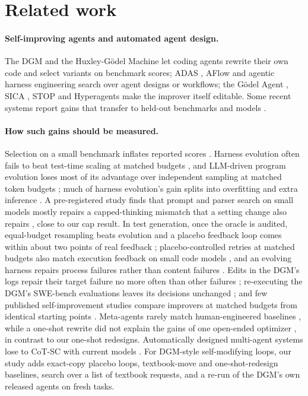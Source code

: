 \section{Related work}\label{sec:related}
\paragraph{Self-improving agents and automated agent design.} The DGM \citep{zhang2026dgm} and the Huxley-G\"odel
Machine \citep{wang2026hgm} let coding agents rewrite their own code and select variants on benchmark scores; ADAS
\citep{hu2025adas}, AFlow \citep{zhang2025aflow} and agentic harness engineering \citep{lin2026ahe} search over agent
designs or workflows; the G\"odel Agent \citep{yin2025godel}, SICA \citep{robeyns2025sica}, STOP \citep{zelikman2023stop}
and Hyperagents \citep{zhang2026hyperagents} make the improver itself editable. Some recent systems report gains that
transfer to held-out benchmarks and models \citep{srikanth2026aide2,lin2026ahe}.

\paragraph{How such gains should be measured.} Selection on a small benchmark inflates reported scores
\citep{hu2026winners,cawley2010overfitting}. Harness evolution often fails to beat test-time scaling at
matched budgets \citep{wang2026rethinking}, and LLM-driven program evolution loses most of its advantage over
independent sampling at matched token budgets \citep{oved2026tokens}; much of harness evolution's gain splits into
overfitting and extra inference \citep{ding2026hda}. A pre-registered study finds that prompt and parser search on small models mostly repairs
a capped-thinking mismatch that a setting change also repairs \citep{xu2026harnessrepair}, close to our cap result. In
test generation, once the oracle is audited, equal-budget resampling beats evolution and a placebo feedback loop comes
within about two points of real feedback \citep{liang2026testgen}; placebo-controlled retries at matched budgets also
match execution feedback on small code models \citep{verma2026tryagain}, and an evolving harness repairs process
failures rather than content failures \citep{tian2026ceiling}. Edits in the DGM's logs repair their target failure no more often than other failures
\citep{he2026failurefeedback}; re-executing the DGM's SWE-bench evaluations leaves its decisions unchanged
\citep{ding2026reexecuting}; and few published self-improvement studies compare improvers at matched budgets from identical starting points
\citep{chen2026auditing}. Meta-agents rarely match human-engineered baselines \citep{lu2026metaagent}, while a one-shot
rewrite did not explain the gains of one open-ended optimizer \citep{xue2026rethinking}, in contrast to our one-shot
redesigns. Automatically designed multi-agent systems lose to CoT-SC with current models
\citep{jwalapuram2026illusion}. For DGM-style self-modifying loops, our study adds exact-copy placebo loops, textbook-move and one-shot-redesign
baselines, search over a list of textbook requests, and a re-run of the DGM's own released agents on fresh tasks.

